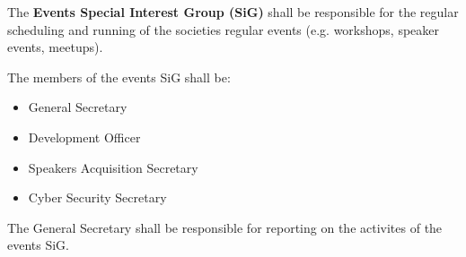 \begin{clause}
    The \textbf{Events Special Interest Group (SiG)} shall be responsible for the regular scheduling and running of the societies regular events (e.g. workshops, speaker events, meetups).
\end{clause}

\begin{subclause}
    The members of the events SiG shall be:
    \begin{itemize}
        \item General Secretary
        \item Development Officer
        \item Speakers Acquisition Secretary
        \item Cyber Security Secretary
    \end{itemize}
\end{subclause}

\begin{subclause}
    The General Secretary shall be responsible for reporting on the activites of the events SiG.
\end{subclause}